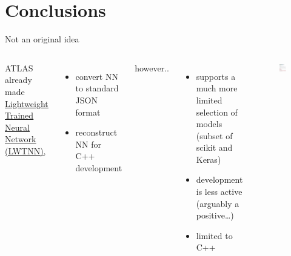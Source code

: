 \documentclass[aspectratio=169,9pt]{beamer}
\begin{document}
\section{Conclusions}
\begin{frame}[t]{Not an original idea}
  \begin{columns}
      ATLAS already made \href{https://github.com/lwtnn/lwtnn}{\color{blue}\underline{Lightweight Trained Neural Network (LWTNN)}},
      \begin{itemize}
        \item convert NN to standard JSON format
        \item reconstruct NN for C++ development
      \end{itemize}
      however..
      \begin{itemize}
        \item supports a much more limited selection of models (subset of scikit and Keras)
        \item development is less active (arguably a positive\ldots)
        \item limited to C++
      \end{itemize}
      \begin{figure}
        \centering
        \includegraphics[width=.8\textwidth]{screenshot_lwtnn.png}
      \end{figure}
  \end{columns}
\end{frame}
\end{document}
